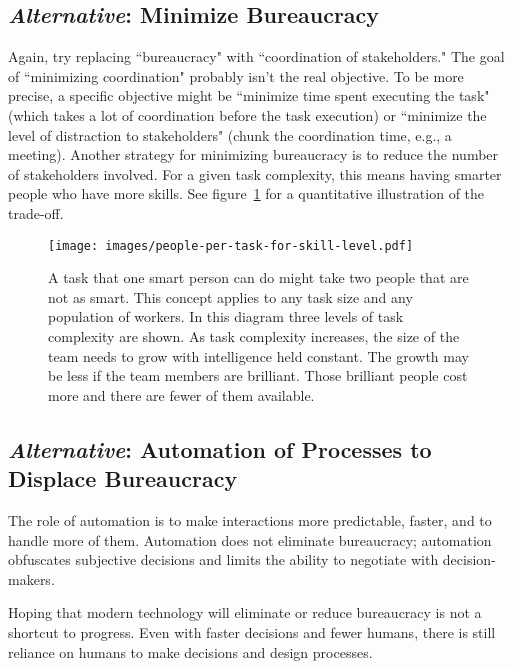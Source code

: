 \subsection*{\textit{Alternative}: Minimize Bureaucracy}
Again, try replacing ``bureaucracy" with ``coordination of stakeholders." The goal of ``minimizing coordination" probably isn't the real objective. To be more precise, a specific objective might be ``minimize time spent executing the task" (which takes a lot of coordination before the task execution) or ``minimize the level of distraction to stakeholders" (chunk the coordination time, e.g., a meeting). Another strategy for minimizing bureaucracy is to reduce the number of stakeholders involved. For a given task complexity, this means having smarter people who have more skills. See figure~\ref{fig:complexity-and-size} for a quantitative illustration of the trade-off. 


\begin{figure}
\centering
\texttt{[image: images/people-per-task-for-skill-level.pdf]}
\caption{A task that one smart person can do might take two  people that are not as smart. This concept applies to any task size and any population of workers. In this diagram three levels of task complexity are shown. As task complexity increases, the size of the team needs to grow with intelligence held constant. The growth may be less if the team members are brilliant. Those brilliant people cost more and there are fewer of them available.}
\label{fig:complexity-and-size}
\end{figure}


\subsection*{\textit{Alternative}: Automation of Processes to Displace Bureaucracy\label{sec:automation}}

The role of automation is to make interactions more predictable, faster, and to handle more of them. Automation does not eliminate bureaucracy; automation obfuscates  subjective decisions and limits the ability to negotiate with decision-makers.

Hoping that modern technology will eliminate or reduce bureaucracy is not a shortcut to progress. 
Even with faster decisions and fewer humans, there is still reliance on humans to make decisions and design processes.

